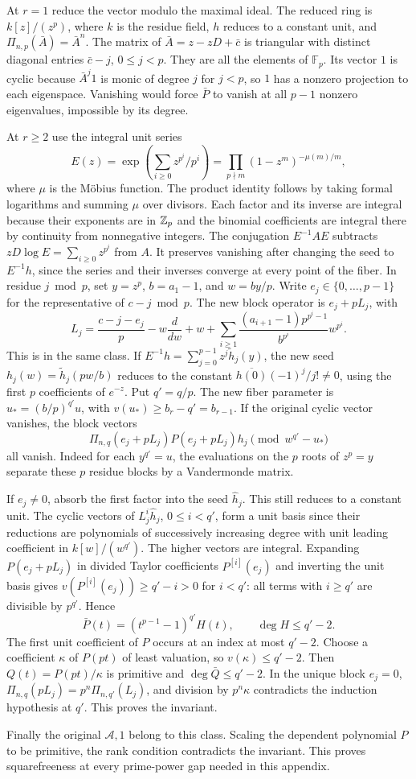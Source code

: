 At \(r=1\) reduce the vector modulo the maximal ideal.
The reduced ring is \(k[z]/(z^p)\), where \(k\) is the residue field,
\(h\) reduces to a constant unit, and \(\Pi_{n,p}(\bar A)=\bar A^n\).
The matrix of \(\bar A=z-zD+\bar c\) is triangular with distinct
diagonal entries \(\bar c-j\), \(0\le j<p\). They are all the
elements of \(\mathbb F_p\). Its vector \(1\) is cyclic because
\(\bar A^j1\) is monic of degree \(j\) for \(j<p\), so \(1\) has
a nonzero projection to each eigenspace. Vanishing would force
\(\bar P\) to vanish at all \(p-1\) nonzero eigenvalues, impossible
by its degree.

At \(r\ge2\) use the integral unit series
\[
 E(z)=\exp\!\left(\sum_{i\ge0}z^{p^i}/p^i\right)
     =\prod_{p\nmid m}(1-z^m)^{-\mu(m)/m},
\]
where \(\mu\) is the M\"obius function. The product identity follows
by taking formal logarithms and summing \(\mu\) over divisors.
Each factor and its inverse are integral because their exponents
are in \(\mathbb Z_p\) and the binomial coefficients are integral there
by continuity from nonnegative integers. The conjugation \(E^{-1}AE\)
subtracts \(zD\log E=\sum_{i\ge0}z^{p^i}\) from \(A\).
It preserves vanishing after changing the seed to \(E^{-1}h\),
since the series and their inverses converge at every point of the
fiber. In residue \(j\bmod p\), set \(y=z^p\),
\(b=a_1-1\), and \(w=by/p\). Write \(e_j\in\{0,\ldots,p-1\}\)
for the representative of \(c-j\bmod p\). The new block operator
is \(e_j+pL_j\), with
\[
 L_j=\frac{c-j-e_j}{p}-w\frac d{dw}+w+
        \sum_{i\ge1}\frac{(a_{i+1}-1)p^{p^i-1}}{b^{p^i}}w^{p^i}.
\]
This is in the same class. If \(E^{-1}h=\sum_{j=0}^{p-1}z^j
\widetilde h_j(y)\), the new seed
\(h_j(w)=\widetilde h_j(pw/b)\) reduces to the constant
\(\overline{h(0)}(-1)^j/j!\ne0\), using the first \(p\)
coefficients of \(e^{-z}\). Put \(q'=q/p\). The new fiber parameter
is \(u_*=(b/p)^{q'}u\), with \(v(u_*)\ge b_r-q'=b_{r-1}\).
If the original cyclic vector vanishes, the block vectors
\[
 \Pi_{n,q}(e_j+pL_j)P(e_j+pL_j)h_j
             \pmod{w^{q'}-u_*}
\]
all vanish. Indeed for each \(y^{{q'}}=u\), the evaluations on the
\(p\) roots of \(z^p=y\) separate these \(p\) residue blocks by a
Vandermonde matrix.

If \(e_j\ne0\), absorb the first factor into the seed \(\widehat h_j\).
This still reduces to a constant unit. The cyclic vectors of
\(L_j^i\widehat h_j\), \(0\le i<q'\), form a unit basis since
their reductions are polynomials of successively increasing degree
with unit leading coefficient in \(k[w]/(w^{q'})\).
The higher vectors are integral. Expanding \(P(e_j+pL_j)\)
in divided Taylor coefficients \(P^{[i]}(e_j)\) and inverting
the unit basis gives \(v(P^{[i]}(e_j))\ge q'-i>0\) for \(i<q'\):
all terms with \(i\ge q'\) are divisible by \(p^{q'}\).
Hence
\[
 \bar P(t)=(t^{p-1}-1)^{q'}H(t),\qquad \deg H\le q'-2.
\]
The first unit coefficient of \(P\) occurs at an index at most
\(q'-2\). Choose a coefficient \(\kappa\) of \(P(pt)\) of
least valuation, so \(v(\kappa)\le q'-2\).
Then \(Q(t)=P(pt)/\kappa\) is primitive and \(\deg\bar Q\le q'-2\).
In the unique block \(e_j=0\),
\(\Pi_{n,q}(pL_j)=p^n\Pi_{n,q'}(L_j)\), and division by
\(p^n\kappa\) contradicts the induction hypothesis at \(q'\).
This proves the invariant.

Finally the original \(\mathcal A,1\) belong to this class.
Scaling the dependent polynomial \(P\) to be primitive, the
rank condition contradicts the invariant. This proves
squarefreeness at every prime-power gap needed in this appendix.
